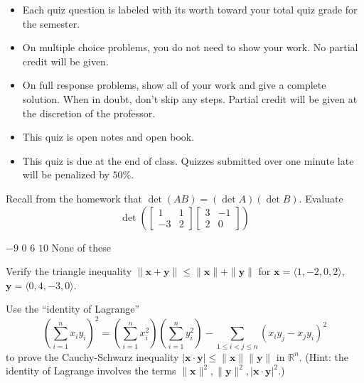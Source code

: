 \documentclass[12pt]{exam}
\newcommand{\vect}[1]{\ensuremath{\mathbf{#1}}}
\newcommand{\<}{\langle}
\renewcommand{\>}{\rangle}
\begin{document}
\begin{center}
\end{center}
\vspace{0.1in}

\vspace{12pt}

\begin{itemize}
  \item Each quiz question is labeled with its worth toward your total quiz
        grade for the semester.
  \item On multiple choice problems, you do not need to show your work. No
        partial credit will be given.
  \item On full response problems, show all of your work and give a
        complete solution. When in doubt, don't skip any steps. Partial
        credit will be given at the discretion of the professor.
  \item This quiz is open notes and open book.
  \item This quiz is due at the end of class. Quizzes submitted over one minute
        late will be penalized by \(50\%\).
\end{itemize}

\newpage

\begin{questions}

\question[10]
Recall from the homework that \(\det(AB)=(\det A)(\det B)\).
Evaluate
\[
  \det\left(
    \left[
    \begin{matrix}
       1 &  1 \\
      -3 &  2
    \end{matrix}
    \right]
    \left[
    \begin{matrix}
       3 & -1 \\
       2 &  0
    \end{matrix}
    \right]
  \right)
\]


\begin{checkboxes}
\choice \(-9\)
\choice \(0\)
\choice \(6\)
\choice \(10\)
\choice None of these
\end{checkboxes}

\question[10]
Verify the triangle inequality
\(\|\vect x+\vect y\|\leq\|\vect x\|+\|\vect y\|\)
for \(\vect x=\<1,-2,0,2\>,\) \(\vect y=\<0,4,-3,0\>\).

\vfill
\newpage

\question[10]
Use the ``identity of Lagrange''
  \[
    \left(\sum_{i=1}^n x_iy_i\right)^2
      =
    \left(\sum_{i=1}^n x_i^2\right)
    \left(\sum_{i=1}^n y_i^2\right)
      -
    \sum_{1\leq i<j\leq n}
    \left(x_iy_j-x_jy_i \right)^2
  \]
to prove the Cauchy-Schwarz inequality
\(|\vect x\cdot\vect y|\leq\|\vect x\|\|\vect y\|\) in \(\mathbb R^n\).
(Hint: the identity of Lagrange involves the terms
\(\|\vect x\|^2,\|\vect y\|^2,|\vect x\cdot\vect y|^2\).)
\vfill
\end{questions}
\end{document}
